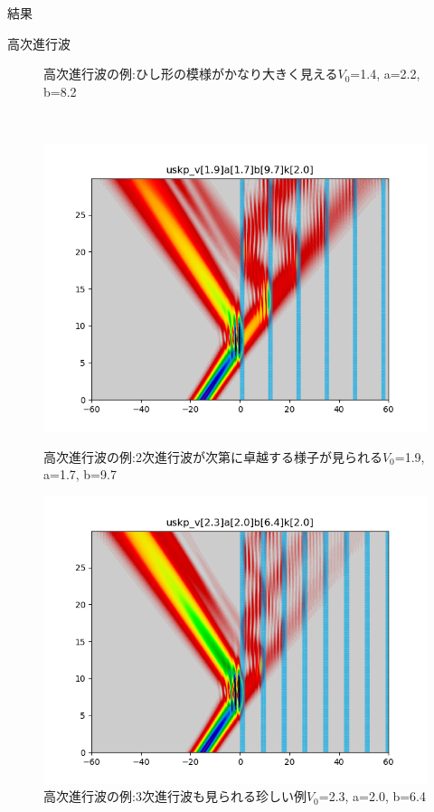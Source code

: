 \documentclass[a4paper, lualatex]{bxjsarticle}
\begin{document}
\begin{section}{結果}
\begin{subsection}{高次進行波}
\begin{figure}[h]
\begin{minipage}{0.5\hsize}
                \caption{高次進行波の例:ひし形の模様がかなり大きく見える$V_0$=1.4, a=2.2, b=8.2}
                \label{thick_wide}
            \end{minipage}\\
            \begin{minipage}{0.5\hsize}
                \centering
                \includegraphics[width=0.9\hsize]{tajushin3.png}
                \caption{高次進行波の例:2次進行波が次第に卓越する様子が見られる$V_0$=1.9, a=1.7, b=9.7}
                \label{wide}
            \end{minipage}
            \begin{minipage}{0.5\hsize}
                \centering
                \includegraphics[width=0.9\hsize]{tajushin4.png}
                \caption{高次進行波の例:3次進行波も見られる珍しい例$V_0$=2.3, a=2.0, b=6.4}
                \label{narrow}

\end{minipage}
\end{figure}
\end{subsection}
\end{section}
\end{document}
